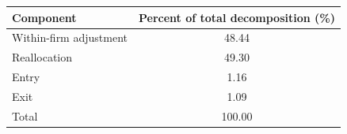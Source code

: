 {\small
\begin{tabular}{lc}
\toprule
Component & Percent of total decomposition (\%) \\
\midrule
Within-firm adjustment &     48.44\\
Reallocation &     49.30\\
Entry &      1.16\\
Exit &      1.09\\
\midrule
Total &    100.00\\
\bottomrule
\end{tabular}}
